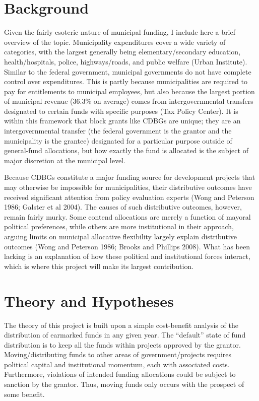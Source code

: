 \documentclass[12pt,a4paper]{article}
\begin{document}
\section{Background}
\par Given the fairly esoteric nature of municipal funding, I include here a brief overview of the topic. Municipality expenditures cover a wide variety of categories, with the largest generally being elementary/secondary education, health/hospitals, police, highways/roads, and public welfare (Urban Institute). Similar to the federal government, municipal governments do not have complete control over expenditures. This is partly because municipalities are required to pay for entitlements to municipal employees, but also because the largest portion of municipal revenue (36.3\% on average) comes from intergovernmental transfers designated to certain funds with specific purposes (Tax Policy Center). It is within this framework that block grants like CDBGs are unique; they are an intergovernmental transfer (the federal government is the grantor and the municipality is the grantee) designated for a particular purpose outside of general-fund allocations, but how exactly the fund is allocated is the subject of major discretion at the municipal level.

\par Because CDBGs constitute a major funding source for development projects that may otherwise be impossible for municipalities, their distributive outcomes have received significant attention from policy evaluation experts (Wong and Peterson 1986; Galster et al 2004). The causes of such distributive outcomes, however, remain fairly murky. Some contend allocations are merely a function of mayoral political preferences, while others are more institutional in their approach, arguing limits on municipal allocative flexibility largely explain distributive outcomes (Wong and Peterson 1986; Brooks and Phillips 2008). What has been lacking is an explanation of how these political and institutional forces interact, which is where this project will make its largest contribution.

\section{Theory and Hypotheses}
\par The theory of this project is built upon a simple cost-benefit analysis of the distribution of earmarked funds in any given year. The ``default'' state of fund distribution is to keep all the funds within projects approved by the grantor. Moving/distributing funds to other areas of government/projects requires political capital and institutional momentum, each with associated costs. Furthermore, violations of intended funding allocations could be subject to sanction by the grantor. Thus, moving funds only occurs with the prospect of some benefit.
\end{document}
